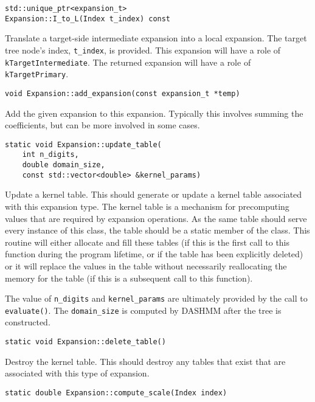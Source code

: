 \begin{lstlisting}
std::unique_ptr<expansion_t>
Expansion::I_to_L(Index t_index) const
\end{lstlisting}

\noindent Translate a target-side intermediate expansion into a local
expansion. The target tree node's index, \texttt{t\_index}, is provided.
This expansion will have a role of \texttt{kTargetIntermediate}.
The returned expansion will have a role of \texttt{kTargetPrimary}.

\begin{lstlisting}
void Expansion::add_expansion(const expansion_t *temp)
\end{lstlisting}

\noindent Add the given expansion to this expansion. Typically this involves
summing the coefficients, but can be more involved in some cases.

\begin{lstlisting}
static void Expansion::update_table(
    int n_digits,
    double domain_size,
    const std::vector<double> &kernel_params)
\end{lstlisting}

\noindent Update a kernel table. This should generate or update a kernel table
associated
with this expansion type. The kernel table is a mechanism for precomputing
values that are required by expansion operations. As the same table should
serve every instance of this class, the table should be a static member of the
class. This routine will either allocate and fill these tables (if this is the
first call to this function during the program lifetime, or if the table has
been explicitly deleted) or it will replace the values in the table without
necessarily reallocating the memory for the table (if this is a subsequent call
to this function).

The value of \texttt{n\_digits} and \texttt{kernel\_params} are ultimately
provided by the call to \texttt{evaluate()}. The
\texttt{domain\_size} is computed by DASHMM after the tree is constructed.

\begin{lstlisting}
static void Expansion::delete_table()
\end{lstlisting}

\noindent Destroy the kernel table. This should destroy any tables that exist
that are associated with this type of expansion.

\begin{lstlisting}
static double Expansion::compute_scale(Index index)
\end{lstlisting}

